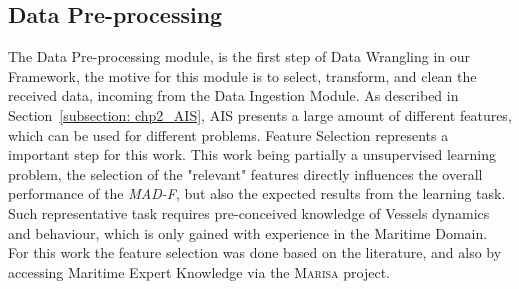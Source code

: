 







\subsection{Data Pre-processing}
\label{subsection: 3 Pre-processing}
The Data Pre-processing module, is the first step of Data Wrangling in our Framework, the motive for this module is to select, transform, and clean the received data, incoming from the Data Ingestion Module. 
As described in Section~\ref{subsection: chp2_AIS}, AIS presents a large amount of different features, which can be used for different problems. Feature Selection represents a important step for this work. This work being partially a unsupervised learning problem, the selection of the "relevant" features directly influences the overall performance of the \emph{MAD-F}, but also the expected results from the learning task. Such representative task requires pre-conceived knowledge of Vessels dynamics and behaviour, which is only gained with experience in the Maritime Domain. For this work the feature selection was done based on the literature, and also by accessing Maritime Expert Knowledge via the \textsc{Marisa} project.

